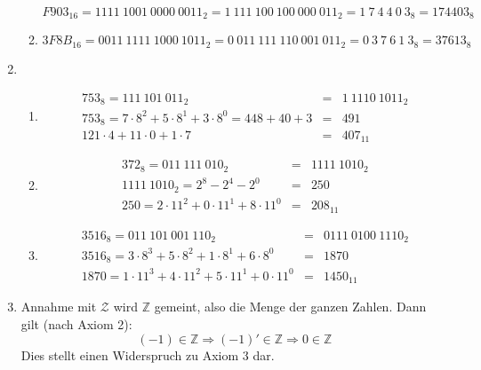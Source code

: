 \documentclass[DIN, pagenumber=false, fontsize=11pt, parskip=half]{scrartcl}
\begin{document}
\begin{enumerate}
\begin{enumerate}
                    \begin{equation*}
                        {F903}_{16} = {1111\ 1001\ 0000\ 0011}_2 = {1\ 111\ 100\ 100\ 000\ 011}_2 = {1\ 7\ 4\ 4\ 0\ 3}_8 = {174403}_8
                    \end{equation*}
                \item
                    \begin{equation*}
                        {3F8B}_{16} = {0011\ 1111\ 1000\ 1011}_2 = {0\ 011\ 111\ 110\ 001\ 011}_2 = {0\ 3\ 7\ 6\ 1\ 3}_8 = {37613}_8
                    \end{equation*}
            \end{enumerate}
        \item 
            \begin{enumerate}
                \item 
                    \begin{eqnarray*}
                        {753}_8 = {111\ 101\ 011}_2 &=& {1\ 1110\ 1011}_2 \\
                        {753}_8 = 7 \cdot 8^2 + 5 \cdot 8^1 + 3 \cdot 8^0 = 448 + 40 + 3 &=& 491\\
                        121 \cdot 4 + 11 \cdot 0 + 1 \cdot 7 &=& {407}_{11}
                    \end{eqnarray*}
                \item 
                    \begin{eqnarray*}
                        {372}_8 = {011\ 111\ 010}_2 &=& {1111\ 1010}_2 \\
                        {1111\ 1010}_2 = 2^8 - 2^4 - 2^0 &=& 250 \\
                        250 = 2 \cdot 11^2 + 0 \cdot 11^1 + 8 \cdot 11^0 &=& {208}_{11}
                    \end{eqnarray*}
                \item 
                    \begin{eqnarray*}
                        {3516}_8 = {011\ 101\ 001\ 110}_2 &=& {0111\ 0100\ 1110}_2 \\
                        {3516}_8 = 3 \cdot 8^3 + 5 \cdot 8^2 + 1 \cdot 8^1 + 6 \cdot 8^0 &=& 1870 \\
                        1870 = 1 \cdot 11^3 + 4 \cdot 11^2 + 5 \cdot 11^1 + 0 \cdot 11^0 &=& {1450}_{11}
                    \end{eqnarray*}
            \end{enumerate}
        \item Annahme mit $\mathcal{Z}$ wird $\mathbb{Z}$ gemeint, also die Menge der ganzen Zahlen. Dann gilt (nach Axiom 2):
            \begin{equation*}
                (-1) \in \mathbb{Z} \Rightarrow  (-1)' \in \mathbb{Z} \Rightarrow 0 \in \mathbb{Z}
            \end{equation*}
            Dies stellt einen Widerspruch zu Axiom 3 dar.
    \end{enumerate}
\end{document}

